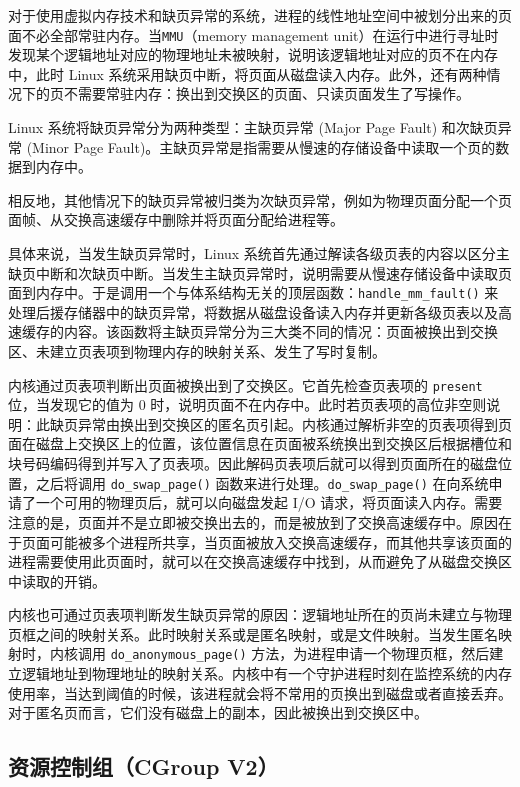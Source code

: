 对于使用虚拟内存技术和缺页异常的系统，进程的线性地址空间中被划分出来的页面不必全部常驻内存。当\texttt{MMU}（memory management unit）在运行中进行寻址时发现某个逻辑地址对应的物理地址未被映射，说明该逻辑地址对应的页不在内存中，此时 Linux 系统采用缺页中断，将页面从磁盘读入内存。此外，还有两种情况下的页不需要常驻内存：换出到交换区的页面、只读页面发生了写操作。

Linux 系统将缺页异常分为两种类型：主缺页异常 (Major Page Fault) 和次缺页异常 (Minor Page Fault)。主缺页异常是指需要从慢速的存储设备中读取一个页的数据到内存中。

相反地，其他情况下的缺页异常被归类为次缺页异常，例如为物理页面分配一个页面帧、从交换高速缓存中删除并将页面分配给进程等。

具体来说，当发生缺页异常时，Linux 系统首先通过解读各级页表的内容以区分主缺页中断和次缺页中断。当发生主缺页异常时，说明需要从慢速存储设备中读取页面到内存中。于是调用一个与体系结构无关的顶层函数：\texttt{handle\_mm\_fault()} 来处理后援存储器中的缺页异常，将数据从磁盘设备读入内存并更新各级页表以及高速缓存的内容。该函数将主缺页异常分为三大类不同的情况：页面被换出到交换区、未建立页表项到物理内存的映射关系、发生了写时复制。

内核通过页表项判断出页面被换出到了交换区。它首先检查页表项的 \texttt{present} 位，当发现它的值为 0 时，说明页面不在内存中。此时若页表项的高位非空则说明：此缺页异常由换出到交换区的匿名页引起。内核通过解析非空的页表项得到页面在磁盘上交换区上的位置，该位置信息在页面被系统换出到交换区后根据槽位和块号码编码得到并写入了页表项。因此解码页表项后就可以得到页面所在的磁盘位置，之后将调用 \texttt{do\_swap\_page()} 函数来进行处理。\texttt{do\_swap\_page()} 在向系统申请了一个可用的物理页后，就可以向磁盘发起 I/O 请求，将页面读入内存。需要注意的是，页面并不是立即被交换出去的，而是被放到了交换高速缓存中。原因在于页面可能被多个进程所共享，当页面被放入交换高速缓存，而其他共享该页面的进程需要使用此页面时，就可以在交换高速缓存中找到，从而避免了从磁盘交换区中读取的开销。

内核也可通过页表项判断发生缺页异常的原因：逻辑地址所在的页尚未建立与物理页框之间的映射关系。此时映射关系或是匿名映射，或是文件映射。当发生匿名映射时，内核调用 \texttt{do\_anonymous\_page()} 方法，为进程申请一个物理页框，然后建立逻辑地址到物理地址的映射关系。内核中有一个守护进程时刻在监控系统的内存使用率，当达到阈值的时候，该进程就会将不常用的页换出到磁盘或者直接丢弃。对于匿名页而言，它们没有磁盘上的副本，因此被换出到交换区中。

\subsection{资源控制组（CGroup V2）}

